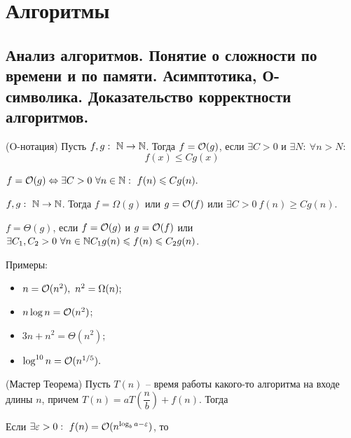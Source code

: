 \chapter{Алгоритмы}

\begin{multicols}{2}
    \raggedcolumns

    \section{Анализ алгоритмов. Понятие о сложности по времени и по памяти. Асимптотика, О-
    символика. Доказательство корректности алгоритмов.}
    \begin{definition}{(O-нотация)}{}
        Пусть $f,g: \ \mathbb{N} \to \mathbb{N}$. Тогда $f = {\cal O}(g)$, если $\exists C > 0$ и $\exists N: \ \forall n > N$:
        \[
            f(x) \leq Cg(x)  
        \]
    \end{definition}
    \begin{proposition}{}{}
        $f = {\cal O}(g) \Leftrightarrow \exists C > 0 \ \forall n \in \mathbb{N}: \ f(n) \leqslant Cg(n).$
    \end{proposition}
    \begin{definition}{}{}
        $f, g: \ \mathbb{N} \to\mathbb{N}$. Тогда $f = \Omega(g)$ или $g = {\cal O}(f)$ или $\exists C > 0\ f(n) \geq Cg(n).$
    \end{definition}
    \begin{definition}{}{}
        $f = \Theta (g)$, если $f = {\cal O}(g)$ и $g = {\cal O}(f)$ или $\exists C_1, C_2 > 0\ \forall n \in \mathbb{N} C_1 g(n) \leqslant f(n) \leqslant C_2g(n)$.
    \end{definition}
     Примеры:
     \begin{multicols}{2}
        \begin{itemize}
            \item $n = \bigOO(n^2), \ \mathmbox{n^2 = \Omega(n);}$
            \item $n\log n = {\cal O}(n^2)$;
            \item $3n + n^2 = \Theta(n^2)$;
            \item $\log^{10} n = {\cal O}(n^{1/5}).$
        \end{itemize}
     \end{multicols}
     \begin{theorema}{(Мастер Теорема)}{}
        Пусть $T(n)$ -- время работы какого-то алгоритма на входе длины $n$, причем $T(n) = aT(\dfrac{n}{b}) + f(n)$. Тогда 
        \begin{enumerate*}
            \item Если $\exists \varepsilon > 0: \ f(n) = {\cal O}(n^{\log_ba - \varepsilon})$, то \[
\]
\end{enumerate*}
\end{theorema}
\end{multicols}
